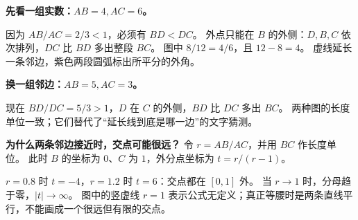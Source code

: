 \clearpage
\begin{explanationbox}
\textbf{先看一组实数：$AB=4,AC=6$。}

因为 $AB/AC=2/3<1$，必须有 $BD<DC$。
外点只能在 $B$ 的外侧：$D,B,C$ 依次排列，$DC$ 比 $BD$ 多出整段 $BC$。
图中 $8/12=4/6$，且 $12-8=4$。
虚线延长一条邻边，紫色两段圆弧标出所平分的外角。

\textbf{换一组邻边：$AB=5,AC=3$。}

现在 $BD/DC=5/3>1$，$D$ 在 $C$ 的外侧，$BD$ 比 $DC$ 多出 $BC$。
两种图的长度单位一致；它们替代了“延长线到底是哪一边”的文字猜测。

\textbf{为什么两条邻边接近时，交点可能很远？}
令 $r=AB/AC$，并用 $BC$ 作长度单位。
此时 $B$ 的坐标为 $0$、$C$ 为 $1$，外分点坐标为 $t=r/(r-1)$。

$r=0.8$ 时 $t=-4$，$r=1.2$ 时 $t=6$：交点都在 $[0,1]$ 外。
当 $r\to1$ 时，分母趋于零，$|t|\to\infty$。
图中的竖虚线 $r=1$ 表示公式无定义；真正等腰时是两条直线平行，不能画成一个很远但有限的交点。
\end{explanationbox}
